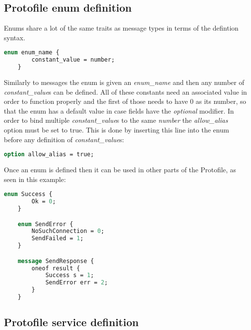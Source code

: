 \subsection{Protofile enum definition}

Enums share a lot of the same traits as message types in terms of the defintion syntax.

\begin{minipage}{\textwidth}
\begin{lstlisting}[language=ProtoBuf, caption=Enum definition syntax in Protofiles]
    enum enum_name {
        constant_value = number;
    }
\end{lstlisting}
\end{minipage}

Similarly to messages the enum is given an \textit{enum\_name} and then any number of \textit{constant\_value}s can be defined. All of these constants need an associated
value in order to function properly and the first of those needs to have 0 as its number, so that the enum has a default value in case fields have the \textit{optional}
modifier. 
In order to bind multiple \textit{constant\_value}s to the same \textit{number} the \textit{allow\_alias} option must be set to true. This is done by inserting this line
into the enum before any definition of \textit{constant\_value}s:

\begin{minipage}{\textwidth}
\begin{lstlisting}[language=ProtoBuf]
    option allow_alias = true;
\end{lstlisting}
\end{minipage}

Once an enum is defined then it can be used in other parts of the Protofile, as seen in this example:

\begin{minipage}{\textwidth}
\begin{lstlisting}[language=ProtoBuf, caption=Excerpt taken from the ProtoBuf files of this project]
    enum Success {
        Ok = 0;
    }

    enum SendError {
        NoSuchConnection = 0;
        SendFailed = 1;
    }

    message SendResponse {
        oneof result {
            Success s = 1;
            SendError err = 2;
        }
    }
\end{lstlisting}
\end{minipage}

\subsection{Protofile service definition}

